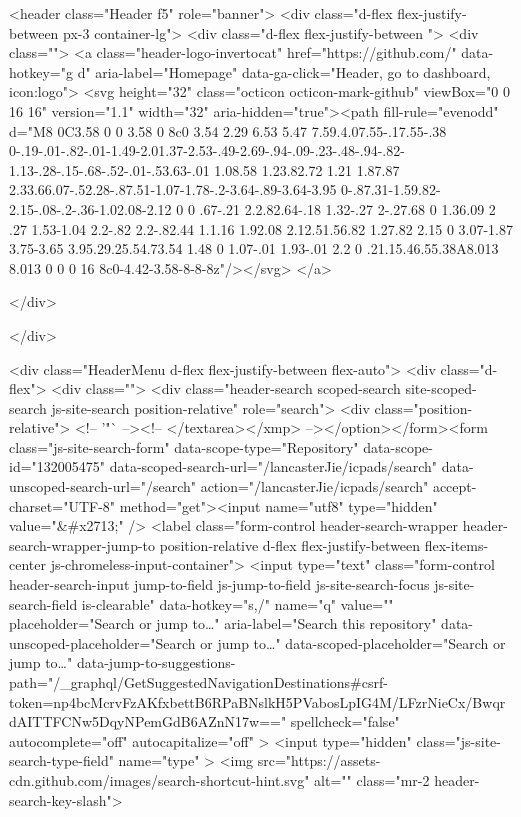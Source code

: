         
<header class="Header  f5" role="banner">
  <div class="d-flex flex-justify-between px-3 container-lg">
    <div class="d-flex flex-justify-between ">
      <div class="">
        <a class="header-logo-invertocat" href="https://github.com/" data-hotkey="g d" aria-label="Homepage" data-ga-click="Header, go to dashboard, icon:logo">
  <svg height="32" class="octicon octicon-mark-github" viewBox="0 0 16 16" version="1.1" width="32" aria-hidden="true"><path fill-rule="evenodd" d="M8 0C3.58 0 0 3.58 0 8c0 3.54 2.29 6.53 5.47 7.59.4.07.55-.17.55-.38 0-.19-.01-.82-.01-1.49-2.01.37-2.53-.49-2.69-.94-.09-.23-.48-.94-.82-1.13-.28-.15-.68-.52-.01-.53.63-.01 1.08.58 1.23.82.72 1.21 1.87.87 2.33.66.07-.52.28-.87.51-1.07-1.78-.2-3.64-.89-3.64-3.95 0-.87.31-1.59.82-2.15-.08-.2-.36-1.02.08-2.12 0 0 .67-.21 2.2.82.64-.18 1.32-.27 2-.27.68 0 1.36.09 2 .27 1.53-1.04 2.2-.82 2.2-.82.44 1.1.16 1.92.08 2.12.51.56.82 1.27.82 2.15 0 3.07-1.87 3.75-3.65 3.95.29.25.54.73.54 1.48 0 1.07-.01 1.93-.01 2.2 0 .21.15.46.55.38A8.013 8.013 0 0 0 16 8c0-4.42-3.58-8-8-8z"/></svg>
</a>

      </div>

    </div>

    <div class="HeaderMenu d-flex flex-justify-between flex-auto">
      <div class="d-flex">
            <div class="">
              <div class="header-search scoped-search site-scoped-search js-site-search position-relative" role="search">
  <div class="position-relative">
    <!-- '"` --><!-- </textarea></xmp> --></option></form><form class="js-site-search-form" data-scope-type="Repository" data-scope-id="132005475" data-scoped-search-url="/lancasterJie/icpads/search" data-unscoped-search-url="/search" action="/lancasterJie/icpads/search" accept-charset="UTF-8" method="get"><input name="utf8" type="hidden" value="&#x2713;" />
      <label class="form-control header-search-wrapper header-search-wrapper-jump-to position-relative d-flex flex-justify-between flex-items-center js-chromeless-input-container">
        <input type="text"
          class="form-control header-search-input jump-to-field js-jump-to-field js-site-search-focus js-site-search-field is-clearable"
          data-hotkey="s,/"
          name="q"
          value=""
          placeholder="Search or jump to…"
          aria-label="Search this repository"
          data-unscoped-placeholder="Search or jump to…"
          data-scoped-placeholder="Search or jump to…"
          data-jump-to-suggestions-path="/_graphql/GetSuggestedNavigationDestinations#csrf-token=np4bcMcrvFzAKfxbettB6RPaBNslkH5PVabosLpIG4M/LFzrNieCx/BwqrdAITTFCNw5DqyNPemGdB6AZnN17w=="
          spellcheck="false"
          autocomplete="off"
          autocapitalize="off"
          >
          <input type="hidden" class="js-site-search-type-field" name="type" >
            <img src="https://assets-cdn.github.com/images/search-shortcut-hint.svg" alt="" class="mr-2 header-search-key-slash">

